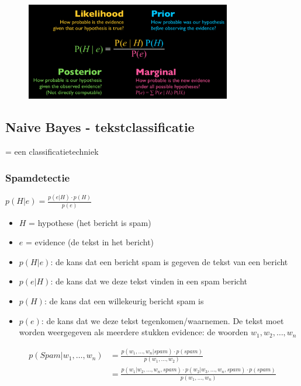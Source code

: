 \documentclass{article}
\begin{document}
\begin{figure}[H]
    \centering
    \includegraphics[width=0.8\textwidth]{bayes.png}
    \caption{}
\end{figure}


\subsection{Naive Bayes - tekstclassificatie}

= een classificatietechniek

\subsubsection{Spamdetectie}

\begin{center}
    $p(H|e) = \frac{p(e|H) \cdot p(H)}{p(e)}$
\end{center}

\begin{itemize}
    \item $H$ = hypothese (het bericht is spam)
    \item $e$ = evidence (de tekst in het bericht)
    \item $p(H|e)$: de kans dat een bericht spam is gegeven de tekst van een bericht
    \item $p(e|H)$: de kans dat we deze tekst vinden in een spam bericht
    \item $p(H)$: de kans dat een willekeurig bericht spam is
    \item $p(e)$: de kans dat we deze tekst tegenkomen/waarnemen. De tekst moet worden weergegeven als meerdere stukken evidence: de woorden $w_1, w_2, \dots, w_n$
\end{itemize}


\begin{align*}
    p(Spam | w_1, \dots, w_n) & = \frac{p(w_1, \dots, w_n | spam) \cdot p(spam)}{p(w_1, \dots, w_2)}\\
    & = \frac{p(w_1 | w_2, \dots, w_n, spam) \cdot p(w_2 | w_3, \dots, w_n, spam) \cdot p(spam)}{p(w_1, \dots, w_n)}
\end{align*}
\end{document}
